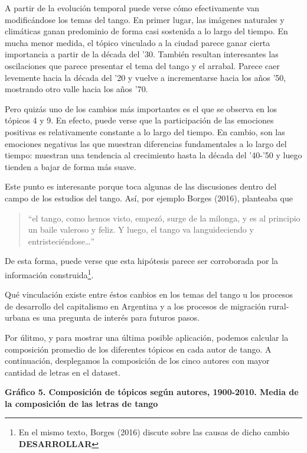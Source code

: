 \documentclass[]{article}
\let\rmarkdownfootnote\footnote%
\def\footnote{\protect\rmarkdownfootnote}
\begin{document}
A partir de la evolución temporal puede verse cómo efectivamente van
modificándose los temas del tango. En primer lugar, las imágenes
naturales y climáticas ganan predominio de forma casi sostenida a lo
largo del tiempo. En mucha menor medida, el tópico vinculado a la ciudad
parece ganar cierta importancia a partir de la década del '30. También
resultan interesantes las oscilaciones que parece presentar el tema del
tango y el arrabal. Parece caer levemente hacia la década del '20 y
vuelve a incrementarse hacia los años '50, mostrando otro valle hacia
los años '70.

Pero quizás uno de los cambios más importantes es el que se observa en
los tópicos 4 y 9. En efecto, puede verse que la participación de las
emociones positivas es relativamente constante a lo largo del tiempo. En
cambio, son las emociones negativas las que muestran diferencias
fundamentales a lo largo del tiempo: muestran una tendencia al
crecimiento hasta la década del '40-'50 y luego tienden a bajar de forma
más suave.

Este punto es interesante porque toca algunas de las discusiones dentro
del campo de los estudios del tango. Así, por ejemplo Borges (2016),
planteaba que

\begin{quote}
``el tango, como hemos visto, empezó, surge de la milonga, y es al
principio un baile valeroso y feliz. Y luego, el tango va languideciendo
y entristeciéndose\ldots{}''
\end{quote}

De esta forma, puede verse que esta hipótesis parece ser corroborada por
la información construida\footnote{En el mismo texto, Borges (2016)
  discute sobre las causas de dicho cambio \textbf{DESARROLLAR}}.

Qué vinculación existe entre éstos canbios en los temas del tango u los
procesos de desarrollo del capitalismo en Argentina y a los procesos de
migración rural-urbana es una pregunta de interés para futuros pasos.

Por úlitmo, y para mostrar una última posible aplicación, podemos
calcular la composición promedio de los diferentes tópicos en cada autor
de tango. A continuación, desplegamos la composición de los cinco
autores con mayor cantidad de letras en el dataset.

\textbf{Gráfico 5. Composición de tópicos según autores, 1900-2010.
Media de la composición de las letras de tango}
\end{document}
